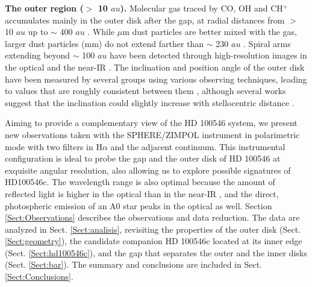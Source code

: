 \documentclass{aa}
\begin{document}
\textbf{The outer region ($>$ 10 $au$).} Molecular gas traced by CO, OH and CH$^+$ accumulates mainly in the outer disk after the gap, at radial distances from $>$ 10 $au$ up to $\sim$ 400 $au$ \citep{vanderplas09,Panic10,Thi11,Liskowsky12,Hein14}. While $\mu$m dust particles are better mixed with the gas, larger dust particles (mm) do not extend farther than $\sim$ 230 $au$ \citep{Pineda14,Walsh14}. Spiral arms extending beyond $\sim$ 100 $au$ have been detected through high-resolution images in the optical and the near-IR \citep{Grady01,Ardila07,Boccaletti13}. The inclination and position angle of the outer disk have been measured by several groups using various observing techniques, leading to values that are roughly consistent between them \citep[around 45$\degr$ and 145$\degr$ respectively; see, e.g.,][]{Pantin00,Augereau01,Liu03,Ardila07,Panic14,Walsh14}, although several works suggest that the inclination could slightly increase with stellocentric distance \citep{Quillen06,Panic10,Pineda14}. 

Aiming to provide a complementary view of the HD 100546 system, we present new observations taken with the SPHERE/ZIMPOL instrument \citep{Beuzit08,Thalmann08} in polarimetric mode with two filters in H$\alpha$ and the adjacent continuum. This instrumental configuration is ideal to probe the gap and the outer disk of HD 100546 at exquisite angular resolution, also allowing us to explore possible signatures of HD100546c. The wavelength range is also optimal because the amount of reflected light is higher in the optical than in the near-IR \citep[see, e.g.,][]{Draine03,Mulders13}, and the direct, photospheric emission of an A0 star peaks in the optical as well. Section \ref{Sect:Observations} describes the observations and data reduction. The data are analyzed in Sect. \ref{Sect:analisis}, revisiting the properties of the outer disk (Sect. \ref{Sect:geometry}), the candidate companion HD 100546c located at its inner edge (Sect. \ref{Sect:hd100546c}), and the gap that separates the outer and the inner disks (Sect. \ref{Sect:bar}). The summary and conclusions are included in Sect. \ref{Sect:Conclusions}. 
\end{document}
